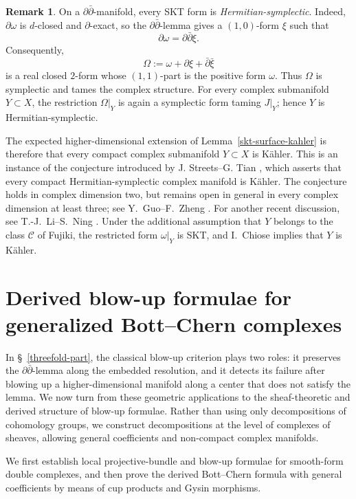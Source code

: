 \documentclass[11pt]{amsart}
\numberwithin{equation}{section}
\def\mc{\mathcal}
\theoremstyle{plain}
\theoremstyle{definition}
\newtheorem{rem}[thm]{Remark}
\begin{document}
\begin{rem}\label{hermitian-symplectic-remark}
On a $\partial\bar\partial$-manifold, every SKT form is
\emph{Hermitian-symplectic}.  Indeed, $\partial\omega$ is $d$-closed and
$\partial$-exact, so the $\partial\bar\partial$-lemma gives a $(1,0)$-form
$\xi$ such that
\[
 \partial\omega=\partial\bar\partial\xi.
\]
Consequently,
\[
 \Omega:=\omega+\partial\xi+\bar\partial\bar\xi
\]
is a real closed $2$-form whose $(1,1)$-part is the positive form $\omega$.
Thus $\Omega$ is symplectic and tames the complex structure.  For every
complex submanifold $Y\subset X$, the restriction $\Omega|_Y$ is again a
symplectic form taming $J|_Y$; hence $Y$ is Hermitian-symplectic.

The expected higher-dimensional extension of
Lemma~\ref{skt-surface-kahler} is therefore that every compact complex submanifold
$Y\subset X$ is K\"ahler.  This is an instance of the conjecture introduced
by J. Streets--G. Tian \cite[Question~1.7]{ST10}, which asserts that every compact
Hermitian-symplectic complex manifold is K\"ahler.  The conjecture holds in
complex dimension two, but remains open in general in every complex dimension
at least three; see Y.~Guo--F.~Zheng
\cite[Conjecture 1 and \S~1]{GZ26}.  For another recent discussion, see
T.-J.~Li--S.~Ning \cite[\S~1.1]{LN26}.  Under the additional assumption
that $Y$ belongs to the class $\mc C$ of Fujiki, the restricted form
$\omega|_Y$ is SKT, and I.~Chiose \cite[Theorem 2.2]{Ch14} implies that $Y$
is K\"ahler.
\end{rem}


\section{Derived blow-up formulae for generalized Bott--Chern complexes}
\label{derived-part}

In \S~\ref{threefold-part}, the classical blow-up criterion plays two
roles: it preserves the $\partial\bar\partial$-lemma along the embedded
resolution, and it detects its failure after blowing up a higher-dimensional
manifold along a center that does not satisfy the lemma.  We now turn from
these geometric applications to the sheaf-theoretic and derived structure
of blow-up formulae.  Rather than using only decompositions of cohomology
groups, we construct decompositions at the level of complexes of sheaves,
allowing general coefficients and non-compact complex manifolds.

We first establish local projective-bundle and blow-up formulae for
smooth-form double complexes, and then prove the derived Bott--Chern formula
with general coefficients by means of cup products and Gysin morphisms.
\end{document}
